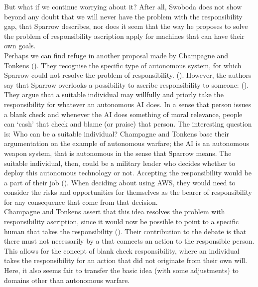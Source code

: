 \documentclass{article}
\newcounter{example}
\begin{document}
But what if we continue worrying about it? After all, Swoboda does not show
beyond any doubt that we will never have the problem with the responsibility
gap, that Sparrow describes, nor does it seem that the way he proposes to solve
the problem of responsibility ascription apply for machines that can have their
own goals.\\

Perhaps we can find refuge in another proposal made by Champagne and Tonkens
(\cite{champagne2015bridging}). They recognise the specific type of autonomous system,
for which Sparrow could not resolve the problem of responsibility.  (\cite[p.
128]{champagne2015bridging}). However, the authors say that Sparrow overlooks a
possibility to ascribe responsibility to someone:  
(\cite[p. 132]{champagne2015bridging}). They argue that a suitable individual
may willfully and priorly take the responsibility for whatever an autonomous AI
does. In a sense that person issues a blank check and whenever the AI does
something of moral relevance, people can `cash' that check and blame (or praise)
that person. The interesting question is: Who can be a suitable individual?
Champagne and Tonkens base their argumentation on the example of autonomous
warfare; the AI is an autonomous weapon system, that is autonomous in the sense
that Sparrow means. The suitable individual, then, could be a military leader who
decides whether to deploy this autonomous technology or not. Accepting the
responsibility would be a  part of their job (\cite[p.
132]{champagne2015bridging}). When deciding about using AWS, they would need to
consider the risks and opportunities for themselves as the bearer of
responsibility for any consequence that come from that decision.\\
Champagne and Tonkens assert that this idea resolves the problem with
responsibility ascription, since it would now be possible to point to a specific
human that takes the responsibility (\cite[p. 132]{champagne2015bridging}).
Their contribution to the debate is that there must not necessarily by a
 that connects an action to the responsible person. This
allows for the concept of blank check responsibility, where an individual takes
the responsibility for an action that did not originate from their own will.
Here, it also seems fair to transfer the basic idea (with some adjustments) to
domains other than autonomous warfare.\\
\end{document}
